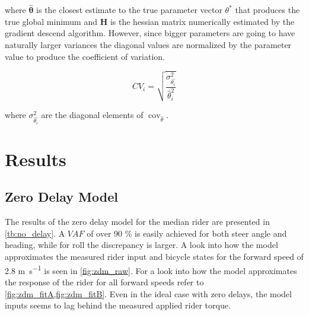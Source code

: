 where \ensuremath{\boldsymbol{\hat{\theta}}} is the closest estimate to the true parameter vector \ensuremath{\theta^*} that produces the true global minimum and \ensuremath{\boldsymbol{H}} is the hessian matrix numerically estimated by the gradient descend algorithm.  However, since bigger parameters are going to have naturally larger variances the diagonal values are normalized by the parameter value to produce the coefficient of variation.

\begin{equation}
    CV_{i}=\sqrt{\frac{\sigma^{2}_{\hat{\theta_i}}}{\hat{\theta}_i^2}}
    \end{equation}

    where \ensuremath{\sigma^{2}_{\hat{\theta_i}}} are the diagonal elements of \ensuremath{ \operatorname{cov}_{\hat{\theta}}}.


\section{Results}


\subsection{Zero Delay Model}
The results of the zero delay model for the median rider are presented in \cref{tb:no_delay}. A \ensuremath{\mathit{VAF}} of over 90 \% is easily achieved for both steer angle and heading, while for roll the discrepancy is larger. A  look into how the model approximates the measured rider input and bicycle states for the  forward speed of 2.8 \si{m.s^{-1}} is seen in \cref{fig:zdm_raw}. For a look into how the model approximates the response of the rider for all forward speeds refer to \cref{fig:zdm_fitA,fig:zdm_fitB}. Even in the ideal case with zero delays, the model inputs seems to lag behind the measured applied rider torque.

